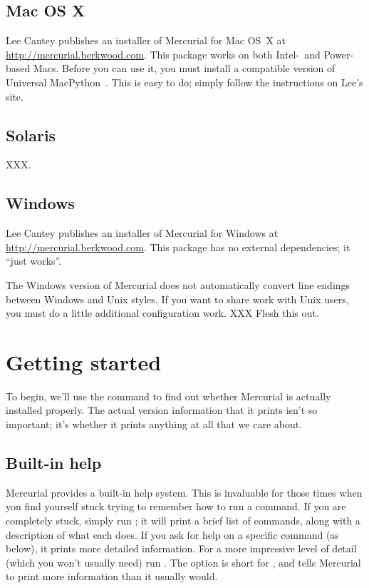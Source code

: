 \subsection{Mac OS X}

Lee Cantey publishes an installer of Mercurial for Mac OS~X at
\url{http://mercurial.berkwood.com}.  This package works on both
Intel-~and Power-based Macs.  Before you can use it, you must install
a compatible version of Universal MacPython~\cite{web:macpython}.  This
is easy to do; simply follow the instructions on Lee's site.

\subsection{Solaris}

XXX.

\subsection{Windows}

Lee Cantey publishes an installer of Mercurial for Windows at
\url{http://mercurial.berkwood.com}.  This package has no external
dependencies; it ``just works''.

\begin{note}
  The Windows version of Mercurial does not automatically convert line
  endings between Windows and Unix styles.  If you want to share work
  with Unix users, you must do a little additional configuration
  work. XXX Flesh this out.
\end{note}

\section{Getting started}

To begin, we'll use the  command to find out whether
Mercurial is actually installed properly.  The actual version
information that it prints isn't so important; it's whether it prints
anything at all that we care about.

\subsection{Built-in help}

Mercurial provides a built-in help system.  This is invaluable for those
times when you find yourself stuck trying to remember how to run a
command.  If you are completely stuck, simply run ; it
will print a brief list of commands, along with a description of what
each does.  If you ask for help on a specific command (as below), it
prints more detailed information.
For a more impressive level of detail (which you won't usually need)
run .  The  option is short
for , and tells Mercurial to print more information
than it usually would.

